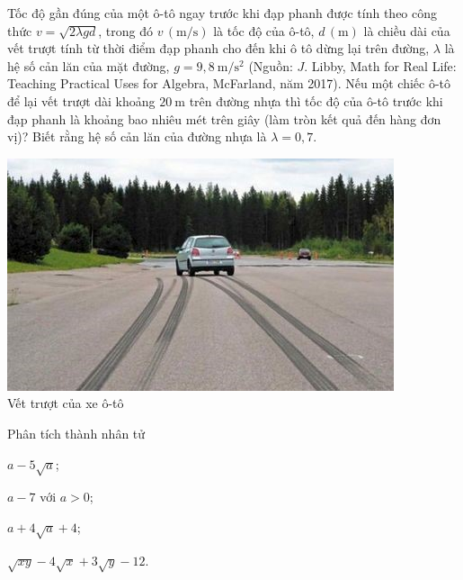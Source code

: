 \begin{bt}
	Tốc độ gần đúng của một ô-tô ngay trước khi đạp phanh được tính theo công thức $v=\sqrt{2 \lambda g d}$, trong đó $v\,(\mathrm{m} / \mathrm{s})$ là tốc độ của ô-tô, $d\,(\mathrm{m})$ là chiều dài của vết trượt tính từ thời điểm đạp phanh cho đến khi ô tô dừng lại trên đường, $\lambda$ là hệ số cản lăn của mặt đường, $g=9,8 \mathrm{~m} / \mathrm{s}^2$ (Nguồn: $J$. Libby, Math for Real Life: Teaching Practical Uses for Algebra, McFarland, năm 2017). Nếu một chiếc ô-tô để lại vết trượt dài khoảng $20 \mathrm{~m}$ trên đường nhựa thì tốc độ của ô-tô trước khi đạp phanh là khoảng bao nhiêu mét trên giây (làm tròn kết quả đến hàng đơn vị)? Biết rằng hệ số cản lăn của đường nhựa là $\lambda=0{,}7$.
\begin{center}
	\includegraphics[width=0.55\linewidth]{images/9C3-2-1}	\\
	Vết trượt của xe ô-tô 
\end{center}
\end{bt}
\begin{bt}%
	Phân tích thành nhân tử
	\begin{listEX}[2]
	\item $a-5\sqrt{a}$;
	\item $a-7$ với $a>0$;
	\item $a+4\sqrt{a}+4$;
	\item $\sqrt{xy}-4\sqrt{x}+3\sqrt{y}-12$.
	\end{listEX}
\end{bt}
